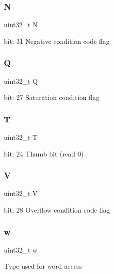 \subsubsection{\texorpdfstring{N}{N}}
{\footnotesize\ttfamily uint32\+\_\+t N}

bit\+: 31 Negative condition code flag \mbox{\label{unionx_p_s_r___type_a65f27ddc4f7e09c14ce7c5211b2e000a}} 
\subsubsection{\texorpdfstring{Q}{Q}}
{\footnotesize\ttfamily uint32\+\_\+t Q}

bit\+: 27 Saturation condition flag \mbox{\label{unionx_p_s_r___type_a6e1cf12e53a20224f6f62c001d9be972}} 
\subsubsection{\texorpdfstring{T}{T}}
{\footnotesize\ttfamily uint32\+\_\+t T}

bit\+: 24 Thumb bit (read 0) \mbox{\label{unionx_p_s_r___type_acd4a2b64faee91e4a9eef300667fa222}} 
\subsubsection{\texorpdfstring{V}{V}}
{\footnotesize\ttfamily uint32\+\_\+t V}

bit\+: 28 Overflow condition code flag \mbox{\label{unionx_p_s_r___type_ad0fb62e7a08e70fc5e0a76b67809f84b}} 
\subsubsection{\texorpdfstring{w}{w}}
{\footnotesize\ttfamily uint32\+\_\+t w}

Type used for word access \mbox{\label{unionx_p_s_r___type_a5ae954cbd9986cd64625d7fa00943c8e}} 
